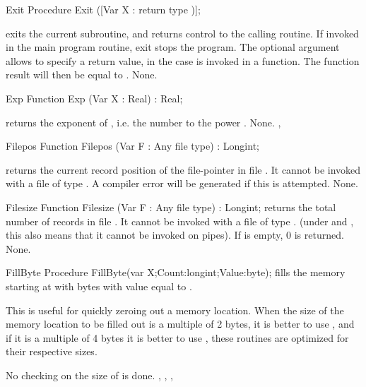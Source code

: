 
\begin{procedure}{Exit}
\Declaration
Procedure Exit ([Var X : return type )];

\Description
{} exits the current subroutine, and returns control to the calling
routine. If invoked in the main program routine, exit stops the program.
The optional argument  allows to specify a return value, in the case
 is invoked in a function. The function result will then be
equal to .
\Errors
None.
\SeeAlso
{}
\end{procedure}


\begin{function}{Exp}
\Declaration
Function Exp (Var X : Real) : Real;

\Description
{} returns the exponent of , i.e. the number  to the
power .
\Errors
None.
\SeeAlso
{}, 
\end{function}


\begin{function}{Filepos}
\Declaration
Function Filepos (Var F : Any file type) : Longint;

\Description
{} returns the current record position of the file-pointer in file
. It cannot be invoked with a file of type . A compiler error
will be generated if this is attempted.
\Errors
None.
\SeeAlso
{}
\end{function}


\begin{function}{Filesize}
\Declaration
Function Filesize (Var F : Any file type) : Longint;
\Description
{} returns the total number of records in file .
It cannot be invoked with a file of type . (under \linux and \unix, this
also means that it cannot be invoked on pipes).
If  is empty, 0 is returned.
\Errors
None.
\SeeAlso
{}
\end{function}


\begin{procedure}{FillByte}
\Declaration
Procedure FillByte(var X;Count:longint;Value:byte);
\Description
{} fills the memory starting at  with  bytes
with value equal to .

This is useful for quickly zeroing out a memory location. When the size of
the memory location to be filled out is a multiple of 2 bytes, it is better
 to use , and if it is a multiple of 4 bytes it is better
to use , these routines are optimized for their respective sizes.

\Errors
No checking on the size of  is done.
\SeeAlso
{}, , , 
\end{procedure}

